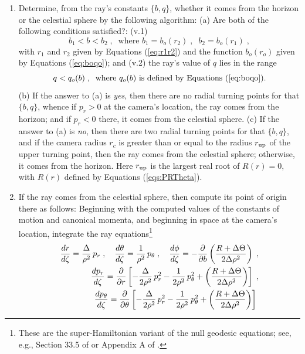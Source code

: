 \documentclass[12pt]{iopart}
\begin{document}
\begin{enumerate}
\item
Determine, from the ray's constants $\{b,q\}$, whether it comes from the horizon or the celestial sphere by the following
algorithm: (a) Are both of the following conditions satisfied?: (v.1)
\begin{equation}
b_1 < b < b_2\;, \;\;  \textrm{where } b_1=b_o(r_2)\;, \; \;
b_2 = b_o(r_1)\;, 
\label{eq:b1b2}
\end{equation}
with $r_1$ and $r_2$ given by Equations  (\ref{eq:r1r2}) and the function
$b_o(r_o)$  given by Equations (\ref{eq:boqo}); and (v.2)  the ray's value of $q$
lies in the range
\begin{equation}
q< q_o(b)\;, \;\; \textrm{where } q_o(b) \textrm{ is defined  by Equations (\ref{eq:boqo}).}
\label{eq:qob}
\end{equation}
(b) If the answer to (a) is \emph{yes}, then there are no radial turning points for that $\{b,q\}$, whence  if $p_r>0$ at
the camera's location, the ray comes from the horizon; and if $p_r<0$ there,
it comes from the celestial sphere.  (c) If the answer to (a) is \emph{no}, then there
are two radial turning points for that $\{b,q\}$, and if the camera radius $r_c$ is greater 
than or equal to the radius $r_{\rm up}$ of the upper turning point, then the ray comes from
the celestial sphere; otherwise, it comes from the horizon.  Here
$r_{\rm up}$ is the largest real root
of $R(r)=0$, with $R(r)$  defined by Equations (\ref{eqs:PRTheta}).
\item
 If the ray comes from the celestial sphere, then  compute its point of origin there as follows: 
Beginning with the computed values of the constants of motion and canonical momenta,
and beginning in space at the camera's location, 
integrate the ray equations\footnote{These are the super-Hamiltonian variant of the
null geodesic equations; see, e.g., Section 33.5 of \cite{MTW} or Appendix A of 
\cite{Levin}.}
\begin{eqnarray}
{dr\over d\zeta} = {\Delta\over \rho^2}\, p_r\;, \quad
{d\theta\over d\zeta} = {1\over\rho^2}\, p_\theta\;, \quad
{d\phi\over d\zeta} = 
- {\partial \over \partial b}\left({R+\Delta\Theta\over 2 \Delta \rho^2}\right)\;, \nonumber \\
{d p_r\over d\zeta} =  {\partial \over \partial r}
\left[- {\Delta\over 2\rho^2}\, p_r^2 
- {1\over 2\rho^2}\, p_\theta^2 + \left({R+\Delta\Theta\over 2 \Delta \rho^2}\right) \right] \;, \nonumber \\
{d p_\theta\over d\zeta} =  {\partial \over \partial \theta}\left[- {\Delta\over 2\rho^2}\, p_r^2 
- {1\over 2\rho^2} \,p_\theta^2 + \left({R+\Delta\Theta\over 2 \Delta \rho^2}\right) \right] \;
\label{eq:Rays2}
\end{eqnarray}


\end{enumerate}
\end{document}
